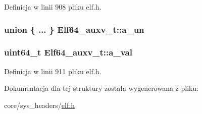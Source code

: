 Definicja w linii 908 pliku elf.\-h.

\hypertarget{struct_elf64__auxv__t_a988fa43fd867a7c0b571fa9f505ecc1c}{
\subsubsection[{a\-\_\-un}]{\setlength{\rightskip}{0pt plus 5cm}union \{ ... \}   Elf64\-\_\-auxv\-\_\-t\-::a\-\_\-un}}\label{struct_elf64__auxv__t_a988fa43fd867a7c0b571fa9f505ecc1c}
\hypertarget{struct_elf64__auxv__t_ae9741865b74b4fbe872d5de874feb207}{
\subsubsection[{a\-\_\-val}]{\setlength{\rightskip}{0pt plus 5cm}uint64\-\_\-t Elf64\-\_\-auxv\-\_\-t\-::a\-\_\-val}}\label{struct_elf64__auxv__t_ae9741865b74b4fbe872d5de874feb207}


Definicja w linii 911 pliku elf.\-h.



Dokumentacja dla tej struktury została wygenerowana z pliku\-:\begin{DoxyCompactItemize}
\item 
core/sys\-\_\-headers/\hyperlink{elf_8h}{elf.\-h}\end{DoxyCompactItemize}
